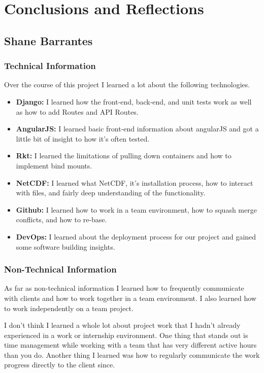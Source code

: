 \documentclass[onecolumn, draftclsnofoot,10pt, compsoc]{article}
\begin{document}
\section{Conclusions and Reflections}

    \subsection{Shane Barrantes}
        \subsubsection{Technical Information}
        Over the course of this project I learned a lot about the following technologies.
        \begin{itemize}
            \item \textbf{Django:} I learned how the front-end, back-end, and unit tests work as well as how to add Routes and API Routes.
            \item \textbf{AngularJS:} I learned basic front-end information about angularJS and got a little bit of insight to how it's often tested.
            \item \textbf{Rkt:} I learned the limitations of pulling down containers and how to implement bind mounts.
            \item \textbf{NetCDF:} I learned what NetCDF, it's installation process, how to interact with files, and fairly deep understanding of the functionality.
            \item \textbf{Github:} I learned how to work in a team environment, how to squash merge conflicts, and how to re-base.
            \item \textbf{DevOps:} I learned about the deployment process for our project and gained some software building insights.
        \end{itemize}
        
        \subsubsection{Non-Technical Information}
        As far as non-technical information I learned how to frequently communicate with clients and how to work together in a team environment. I also learned how to work independently on a team project.

        I don't think I learned a whole lot about project work that I hadn't already experienced in a work or internship environment. One thing that stands out is time management while working with a team that has very different active hours than you do. Another thing I learned was how to regularly communicate the work progress directly to the client since.
\end{document}
